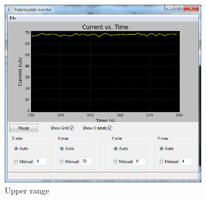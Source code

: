 \begin{figure}[h]
\begin{center}
\includegraphics[width=3.5in]{../figures/10KOhm_70uA_39KOhm.png}
\end{center}
\caption{Upper range}
\end{figure}
